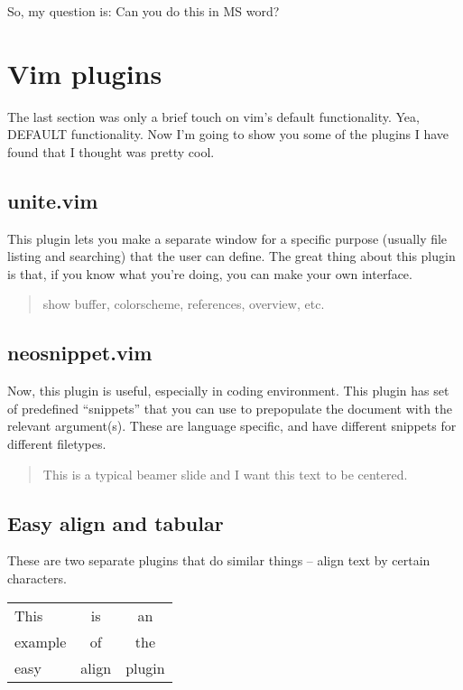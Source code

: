 \documentclass[a4paper, 12pt]{article}
\begin{document}
So, my question is: Can you do this in MS word?

\section{Vim plugins}

The last section was only a brief touch on vim's default functionality.
Yea, DEFAULT functionality.
Now I'm going to show you some of the plugins I have found that I thought was pretty cool.

\subsection{unite.vim}

This plugin lets you make a separate window for a specific purpose (usually file listing and searching) that the user can define.
The great thing about this plugin is that, if you know what you're doing, you can make your own interface.\\

	\begin{quote}
	show buffer, colorscheme, references, overview, etc.
	\end{quote}

\subsection{neosnippet.vim}

Now, this plugin is useful, especially in coding environment.
This plugin has set of predefined ``snippets'' that you can use to prepopulate the document with the relevant argument(s).
These are language specific, and have different snippets for different filetypes.

	\begin{quote}
	This is a typical beamer slide and I want this text to be centered.
	\end{quote}

\subsection{Easy align and tabular}

These are two separate plugins that do similar things --  align text by certain characters.

\begin{tabular}{l|c|c}
This & is & an\\
example & of & the\\
easy & align & plugin\\
\end{tabular}
\end{document}
